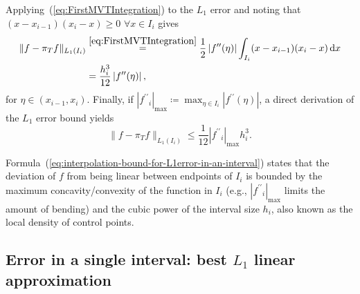 \documentclass[a4paper,english]{IEEEtran}
\begin{document}
Applying~(\ref{eq:FirstMVTIntegration}) to the ${L_{1}}$ error and
noting that $(x-x_{i-1})(x_{i}-x)\geq0$ $\forall x\in I_{i}$ gives
\begin{align}
\|{f}-{\pi_{T}}{f}\|_{{L_{1}}(I_{i})} & \stackrel{\eqref{eq:FirstMVTIntegration}}{=}\frac{1}{2}\left|{{f}^{\prime\prime}}(\eta)\right|\int_{I_{i}}(x-x_{i-1})(x_{i}-x)\,{\mathrm{d}} x\nonumber \\
 & =\frac{h_{i}^{3}}{12}\left|{{f}^{\prime\prime}}(\eta)\right|,\label{eq:interpolant-error-in-an-interval}
\end{align}
for $\eta\in(x_{i-1},x_{i})$. Finally, if ${|{{f}^{\prime\prime}}_{i}|_{\max}}\coloneqq\max_{\eta\in I_{i}}|{{f}^{\prime\prime}}(\eta)|$,
a direct derivation of the ${L_{1}}$ error bound yields
\begin{equation}
\|{f}-{\pi_{T}}{f}\|_{{L_{1}}(I_{i})}\leq\frac{1}{12}{|{{f}^{\prime\prime}}_{i}|_{\max}} h_{i}^{3}.\label{eq:interpolation-bound-for-L1error-in-an-interval}
\end{equation}

Formula~(\ref{eq:interpolation-bound-for-L1error-in-an-interval})
states that the deviation of $f$ from being linear between endpoints
of $I_{i}$ is bounded by the maximum concavity/convexity of the function
in $I_{i}$ (e.g., ${|{{f}^{\prime\prime}}_{i}|_{\max}}$ limits the amount of bending) and the
cubic power of the interval size $h_{i}$, also known as the local
density of control points.

\subsection{Error in a single interval: best ${L_{1}}$ linear approximation\label{sub:Minimum-error-Line-segment}}
\end{document}
